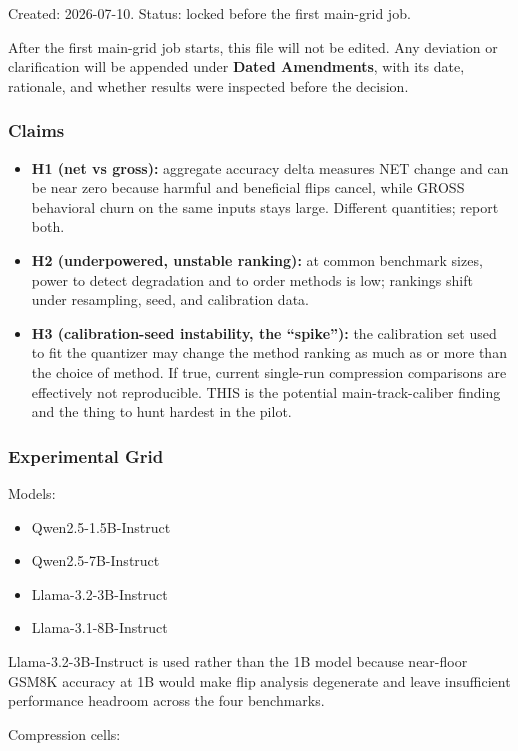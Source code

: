Created: 2026-07-10. Status: locked before the first main-grid job.

After the first main-grid job starts, this file will not be edited. Any deviation or clarification will be appended under \textbf{Dated Amendments}, with its date, rationale, and whether results were inspected before the decision.

\subsubsection{Claims}
\begin{itemize}
\item \textbf{H1 (net vs gross):} aggregate accuracy delta measures NET change and can be near zero because harmful and beneficial flips cancel, while GROSS behavioral churn on the same inputs stays large. Different quantities; report both.
\item \textbf{H2 (underpowered, unstable ranking):} at common benchmark sizes, power to detect degradation and to order methods is low; rankings shift under resampling, seed, and calibration data.
\item \textbf{H3 (calibration-seed instability, the ``spike''):} the calibration set used to fit the quantizer may change the method ranking as much as or more than the choice of method. If true, current single-run compression comparisons are effectively not reproducible. THIS is the potential main-track-caliber finding and the thing to hunt hardest in the pilot.
\end{itemize}
\subsubsection{Experimental Grid}
Models:

\begin{itemize}
\item Qwen2.5-1.5B-Instruct
\item Qwen2.5-7B-Instruct
\item Llama-3.2-3B-Instruct
\item Llama-3.1-8B-Instruct
\end{itemize}
Llama-3.2-3B-Instruct is used rather than the 1B model because near-floor GSM8K accuracy at 1B would make flip analysis degenerate and leave insufficient performance headroom across the four benchmarks.

Compression cells:

